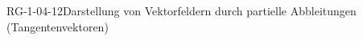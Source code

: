 
\begin{REM}{RG-1-04-12}{Darstellung von Vektorfeldern durch partielle Abbleitungen (Tangentenvektoren)}
\end{REM}
